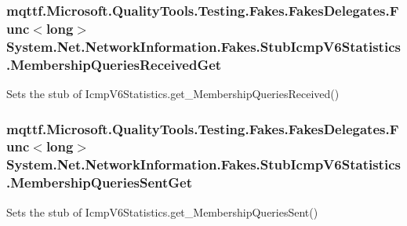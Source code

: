 \hypertarget{class_system_1_1_net_1_1_network_information_1_1_fakes_1_1_stub_icmp_v6_statistics_a42ee420d071389b3e89a818510539dc3}{
\subsubsection[{Membership\-Queries\-Received\-Get}]{\setlength{\rightskip}{0pt plus 5cm}mqttf.\-Microsoft.\-Quality\-Tools.\-Testing.\-Fakes.\-Fakes\-Delegates.\-Func$<$long$>$ System.\-Net.\-Network\-Information.\-Fakes.\-Stub\-Icmp\-V6\-Statistics.\-Membership\-Queries\-Received\-Get}}\label{class_system_1_1_net_1_1_network_information_1_1_fakes_1_1_stub_icmp_v6_statistics_a42ee420d071389b3e89a818510539dc3}


Sets the stub of Icmp\-V6\-Statistics.\-get\-\_\-\-Membership\-Queries\-Received()

\hypertarget{class_system_1_1_net_1_1_network_information_1_1_fakes_1_1_stub_icmp_v6_statistics_a671a23d870d05cb9d18058cdb9bd13b1}{
\subsubsection[{Membership\-Queries\-Sent\-Get}]{\setlength{\rightskip}{0pt plus 5cm}mqttf.\-Microsoft.\-Quality\-Tools.\-Testing.\-Fakes.\-Fakes\-Delegates.\-Func$<$long$>$ System.\-Net.\-Network\-Information.\-Fakes.\-Stub\-Icmp\-V6\-Statistics.\-Membership\-Queries\-Sent\-Get}}\label{class_system_1_1_net_1_1_network_information_1_1_fakes_1_1_stub_icmp_v6_statistics_a671a23d870d05cb9d18058cdb9bd13b1}


Sets the stub of Icmp\-V6\-Statistics.\-get\-\_\-\-Membership\-Queries\-Sent()

